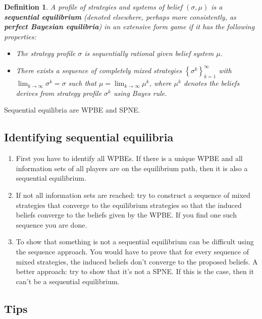 \documentclass[letter, 10pt]{article}
\newtheorem{definition}{Definition}[section]
\begin{document}
\begin{spacing}{1.1}
\begin{definition}
  A profile of strategies and systems of belief $(\sigma, \mu)$ is a
  \textbf{sequential equilibrium} (denoted elsewhere, perhaps more
  consistently, as \textbf{perfect Bayesian equilibria}) in an extensive
  form game if it has the following properties:
  \begin{itemize}
  \item The strategy profile $\sigma$ is sequentially rational given belief
    system $\mu$.
  \item There exists a sequence of completely mixed strategies
    $\left\{\sigma^k\right\}_{k=1}^\infty$ with $\lim_{k \to \infty} \sigma^k =
    \sigma$ such that $\mu = \lim_{k \to \infty} \mu^k$, where $\mu^k$ denotes
    the beliefs derives from strategy profile $\sigma^k$ using Bayes rule.
  \end{itemize}
\end{definition}

Sequential equilibria are WPBE and SPNE.

\subsection{Identifying sequential equilibria}

\begin{enumerate}
\item First you have to identify all WPBEs. If there is a unique WPBE and
  all information sets of all players are on the equilibrium path, then it
  is also a sequential equilibrium.
\item If not all information sets are reached: try to construct a sequence
  of mixed strategies that converge to the equilibrium strategies so that
  the induced beliefs converge to the beliefs given by the WPBE. If you
  find one such sequence you are done.
\item To show that something is not a sequential equilibrium can be
  difficult using the sequence approach. You would have to prove that for
  every sequence of mixed strategies, the induced beliefs don't converge to
  the proposed beliefs. A better approach: try to show that it's not a
  SPNE. If this is the case, then it can't be a sequential equilibrium.
\end{enumerate}

\subsection{Tips}


\end{spacing}
\end{document}
